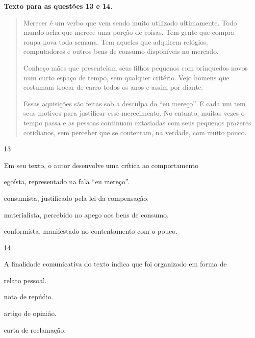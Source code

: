 \textbf{Texto para as questões 13 e 14.}

\begin{quote}
Merecer é um verbo que vem sendo muito utilizado ultimamente. Todo mundo
acha que merece uma porção de coisas. Tem gente que compra roupa nova
toda semana. Tem aqueles que adquirem relógios, computadores e outros
bens de consumo disponíveis no mercado.

Conheço mães que presenteiam seus filhos pequenos com brinquedos novos
num curto espaço de tempo, sem qualquer critério. Vejo homens que
costumam trocar de carro todos os anos e assim por diante.

Essas aquisições são feitas sob a desculpa do ``eu mereço''. E cada um
tem seus motivos para justificar esse merecimento. No entanto, muitas
vezes o tempo passa e as pessoas continuam extasiadas com seus pequenos
prazeres cotidianos, sem perceber que se contentam, na verdade, com
muito pouco.
\end{quote}


\num{13}

Em seu texto, o autor desenvolve uma crítica ao comportamento

\begin{escolha}
\item egoísta, representado na fala ``eu mereço''.

\item consumista, justificado pela lei da compensação.

\item materialista, percebido no apego aos bens de consumo.

\item conformista, manifestado no contentamento com o pouco.
\end{escolha}

\num{14}

A finalidade comunicativa do texto indica que foi organizado em forma de

\begin{escolha}
\item relato pessoal.

\item nota de repúdio.

\item artigo de opinião.

\item carta de reclamação.
\end{escolha}


